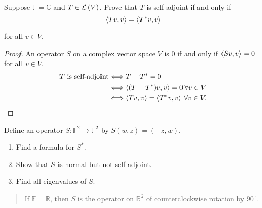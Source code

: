 \begin{exercise}
    Suppose $\mathbb{F} = \mathbb{C}$ and $T \in \mathcal{L}\left({V}\right)$. Prove that $T$ is self-adjoint if and only if
    \[
        \left\langle{Tv, v}\right\rangle = \left\langle{T^{*}v, v}\right\rangle
    \]

    for all $v\in V$.
\end{exercise}

\begin{proof}
    An operator $S$ on a complex vector space $V$ is $0$ if and only if $\left\langle{Sv, v}\right\rangle = 0$ for all $v\in V$.
    \begin{align*}
        \text{$T$ is self-adjoint} & \Longleftrightarrow T - T^{*} = 0                                              \\
                                   & \Longleftrightarrow \left\langle{(T - T^{*})v, v}\right\rangle = 0\,\forall v\in V            \\
                                   & \Longleftrightarrow \left\langle{Tv, v}\right\rangle = \left\langle{T^{*}v, v}\right\rangle\,\forall v\in V.
    \end{align*}
\end{proof}
\newpage

\begin{exercise}
    Define an operator $S: \mathbb{F}^{2}\to \mathbb{F}^{2}$ by $S(w, z) = (-z, w)$.
    \begin{enumerate}[label={(\alph*)}]
        \item Find a formula for $S^{*}$.
        \item Show that $S$ is normal but not self-adjoint.
        \item Find all eigenvalues of $S$.
    \end{enumerate}
\end{exercise}

\begin{quote}
    If $\mathbb{F} = \mathbb{R}$, then $S$ is the operator on $\mathbb{R}^{2}$ of counterclockwise rotation by $90^{\circ}$.
\end{quote}

